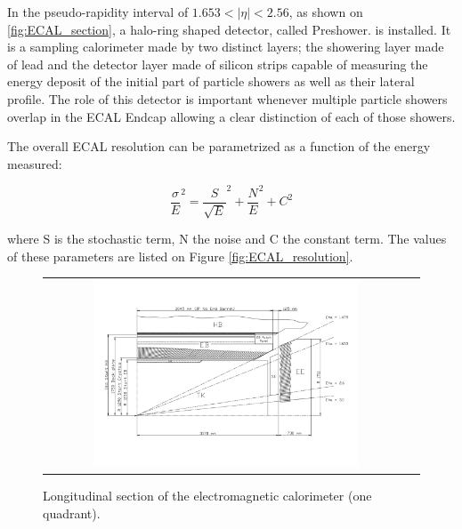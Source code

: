 In the pseudo-rapidity interval of $1.653 < |\eta| < 2.56$, as shown on \autoref{fig:ECAL_section}, a halo-ring shaped detector, called Preshower. is installed. It is a sampling calorimeter made by two distinct layers; the showering layer made of lead and the detector layer made of silicon strips capable of measuring the energy deposit of the initial part of particle showers as well as their lateral profile. The role of this detector is important whenever multiple particle showers overlap in the ECAL Endcap allowing a clear distinction of each of those showers.

The overall ECAL resolution can be parametrized as a function of the energy measured:

\begin{equation}
\dfrac{\sigma}{E}^{2} = \dfrac{S}{\sqrt{E}}^{2} + \dfrac{N}{E}^{2} + C^{2}
\end{equation}

where S is the stochastic term, N the noise and C the constant term. The values of these
parameters are listed on Figure \autoref{fig:ECAL_resolution}.  

\begin{figure}[tbh!]
	\centering
	\begin{tabular}{cc}
		\includegraphics[width=0.75\textwidth]{detector/pics/ECAL_section.pdf}
	\end{tabular}
	\caption{Longitudinal section of the electromagnetic calorimeter (one quadrant).}
	\label{fig:ECAL_section}
\end{figure}


